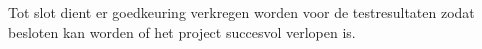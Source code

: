 Tot slot dient er goedkeuring verkregen worden voor de testresultaten zodat besloten kan worden of het project succesvol verlopen is.
